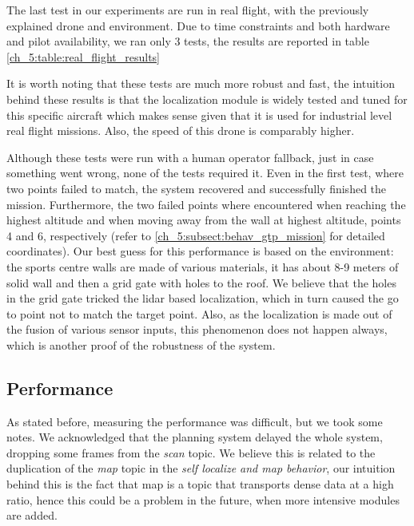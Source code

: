   The last test in our experiments are run in real flight, with the previously explained drone and environment. Due to time constraints and both hardware and pilot availability, we ran only 3 tests, the results are reported in table \ref{ch_5:table:real_flight_results}

  

  It is worth noting that these tests are much more robust and fast, the intuition behind these results is that the localization module is widely tested and tuned for this specific aircraft which makes sense given that it is used for industrial level real flight missions. Also, the speed of this drone is comparably higher.

  Although these tests were run with a human operator fallback, just in case something went wrong, none of the tests required it. Even in the first test, where two points failed to match, the system recovered and successfully finished the mission. Furthermore, the two failed points where encountered when reaching the highest altitude and when moving away from the wall at highest altitude, points 4 and 6, respectively (refer to \ref{ch_5:subsect:behav_gtp_mission} for detailed coordinates). Our best guess for this performance is based on the environment: the sports centre walls are made of various materials, it has about 8-9 meters of solid wall and then a grid gate with holes to the roof. We believe that the holes in the grid gate tricked the lidar based localization, which in turn caused the go to point not to match the target point. Also, as the localization is made out of the fusion of various sensor inputs, this phenomenon does not happen always, which is another proof of the robustness of the system.

  \subsection{Performance}

  As stated before, measuring the performance was difficult, but we took some notes. We acknowledged that the planning system delayed the whole system, dropping some frames from the \textit{scan} topic. We believe this is related to the duplication of the \textit{map} topic in the \textit{self localize and map behavior}, our intuition behind this is the fact that map is a topic that transports dense data at a high ratio, hence this could be a problem in the future, when more intensive modules are added.

